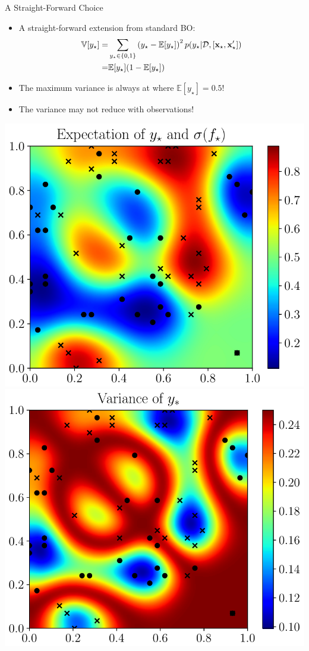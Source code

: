 \documentclass[13pt,aspectratio=1610]{beamer}
\newcommand{\E}{\mathbb{E}}
\newcommand{\V}{\mathbb{V}}
\begin{document}
\begin{frame}{A Straight-Forward Choice}
\begin{minipage}{0.65\textwidth}
\begin{itemize}
\item A straight-forward extension from standard BO:
\begin{align*}
\V[ y_{\star}]  =& \sum_{y_{\star}\in\{0,1\}} \left(y_{\star} - \E[ y_{\star}] \right)^2 p (y_{\star} | \dataSet,  [\inputVector_\star,\inputVector_\star'])\\
=& \E[ y_{\star}](1-\E[ y_{\star}])
\end{align*}
\item The maximum variance is always at where $\E[ y_{\star}]=0.5$!
\item The variance may not reduce with observations!
\end{itemize}
\end{minipage}
%
\begin{minipage}{0.33\textwidth}
\centering 
\includegraphics[width=.95\textwidth]{exp_y_star_cropped.pdf} \\
\includegraphics[width=.95\textwidth]{var_y_star_cropped.pdf} 
\end{minipage}
\end{frame}
\end{document}
